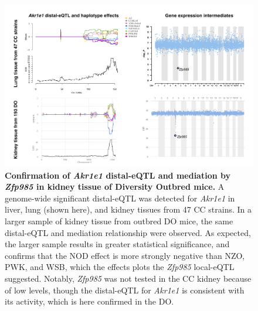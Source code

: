 \documentclass[10pt,letterpaper,twoside]{article}
\begin{document}
\begin{figure}[hp]
\renewcommand{\familydefault}{\sfdefault}\normalfont
\centering
\includegraphics[width=\textwidth, trim={0in 0in 0in 0in}, clip]{figs/do_confirmation_akr1e1.png}
\caption{\textbf{Confirmation of \textit{Akr1e1} distal-eQTL and mediation by \textit{Zfp985} in kidney tissue of Diversity Outbred mice.} 
A genome-wide significant distal-eQTL was detected for \textit{Akr1e1} in liver, lung (shown here), and kidney tissues from 47 CC strains. In a larger sample of kidney tissue from outbred DO mice, the same distal-eQTL and mediation relationship were observed. As expected, the larger sample results in greater statistical significance, and confirms that the NOD effect is more strongly negative than NZO, PWK, and WSB, which the effects plots the \textit{Zfp985} local-eQTL suggested. Notably, \textit{Zfp985} was not tested in the CC kidney because of low levels, though the distal-eQTL for \textit{Akr1e1} is consistent with its activity, which is here confirmed in the DO.
\label{fig:do_akr1e1}}
\end{figure}

\clearpage
\end{document}
